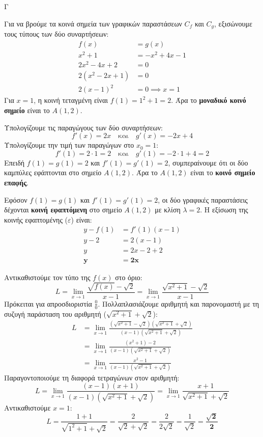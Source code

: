 \begin{thema}{Γ}
\begin{erwthma}
\item Για να βρούμε τα κοινά σημεία των γραφικών παραστάσεων $C_f$ και $C_g$, εξισώνουμε τους τύπους των δύο συναρτήσεων:
\begin{align*}
f(x) &= g(x) \\
x^2 + 1 &= -x^2 + 4x - 1 \\
2x^2 - 4x + 2 &= 0 \\
2(x^2 - 2x + 1) &= 0 \\
2(x-1)^2 &= 0 \implies x = 1
\end{align*}
Για $x=1$, η κοινή τεταγμένη είναι $f(1) = 1^2 + 1 = 2$. Άρα το \textbf{μοναδικό κοινό σημείο} είναι το $A(1, 2)$.

Υπολογίζουμε τις παραγώγους των δύο συναρτήσεων:
\[ f'(x) = 2x \quad \text{και} \quad g'(x) = -2x + 4 \]
Υπολογίζουμε την τιμή των παραγώγων στο $x_0 = 1$:
\[ f'(1) = 2 \cdot 1 = 2 \quad \text{και} \quad g'(1) = -2 \cdot 1 + 4 = 2 \]
Επειδή $f(1) = g(1) = 2$ και $f'(1) = g'(1) = 2$, συμπεραίνουμε ότι οι δύο καμπύλες εφάπτονται στο σημείο $A(1, 2)$. 
Άρα το $A(1, 2)$ είναι το \textbf{κοινό σημείο επαφής}.

\item Εφόσον $f(1) = g(1)$ και $f'(1) = g'(1) = 2$, οι δύο γραφικές παραστάσεις δέχονται \textbf{κοινή εφαπτόμενη} στο σημείο $A(1, 2)$ με κλίση $\lambda = 2$.
Η εξίσωση της κοινής εφαπτομένης ($\varepsilon$) είναι:
\begin{align*}
y - f(1) &= f'(1)(x - 1) \\
y - 2 &= 2(x - 1) \\
y &= 2x - 2 + 2 \\
\boldsymbol{y} &\boldsymbol{= 2x}
\end{align*}

\item Αντικαθιστούμε τον τύπο της $f(x)$ στο όριο:
\[ L = \lim_{x \to 1} \frac{\sqrt{f(x)} - \sqrt{2}}{x - 1} = \lim_{x \to 1} \frac{\sqrt{x^2 + 1} - \sqrt{2}}{x - 1} \]
Πρόκειται για απροσδιοριστία $\frac{0}{0}$. Πολλαπλασιάζουμε αριθμητή και παρονομαστή με τη συζυγή παράσταση του αριθμητή ($\sqrt{x^2+1} + \sqrt{2}$):
\begin{align*}
L &= \lim_{x \to 1} \frac{\left( \sqrt{x^2 + 1} - \sqrt{2} \right) \left( \sqrt{x^2 + 1} + \sqrt{2} \right)}{(x - 1) \left( \sqrt{x^2 + 1} + \sqrt{2} \right)} \\
&= \lim_{x \to 1} \frac{(x^2 + 1) - 2}{(x - 1) \left( \sqrt{x^2 + 1} + \sqrt{2} \right)} \\
&= \lim_{x \to 1} \frac{x^2 - 1}{(x - 1) \left( \sqrt{x^2 + 1} + \sqrt{2} \right)}
\end{align*}
Παραγοντοποιούμε τη διαφορά τετραγώνων στον αριθμητή:
\[ L = \lim_{x \to 1} \frac{(x - 1)(x + 1)}{(x - 1) \left( \sqrt{x^2 + 1} + \sqrt{2} \right)} = \lim_{x \to 1} \frac{x + 1}{\sqrt{x^2 + 1} + \sqrt{2}} \]
Αντικαθιστούμε $x = 1$:
\[ L = \frac{1 + 1}{\sqrt{1^2 + 1} + \sqrt{2}} = \frac{2}{\sqrt{2} + \sqrt{2}} = \frac{2}{2\sqrt{2}} = \frac{1}{\sqrt{2}} = \boldsymbol{\frac{\sqrt{2}}{2}} \]


\end{erwthma}
\end{thema}
